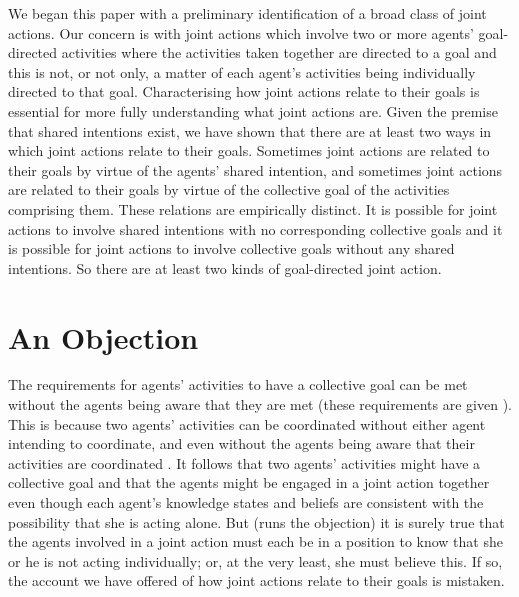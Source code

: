 \documentclass[12pt,a4paper]{extarticle}
\begin{document}
We began this paper with a preliminary identification of a broad class of joint actions.  
Our concern is with joint actions 
	which involve two or more agents' goal-directed activities 
		where the activities taken together are directed to a goal and this is not, or not only, a matter of each agent's activities being individually directed to that goal.
Characterising how joint actions relate to their goals is essential for more fully understanding what joint actions are.
Given the premise that shared intentions exist, we have shown that there are at least two ways in which joint actions relate to their goals.
Sometimes joint actions are related to their goals by virtue of the agents' shared intention, and sometimes joint actions are related to their goals by virtue of the collective goal of the activities comprising them.  
These relations are empirically distinct.  
It is possible for joint actions to involve shared intentions with no corresponding collective goals and it is possible for joint actions to involve collective goals without any shared intentions.
So there are at least two kinds of goal-directed joint action.


\section{An Objection
	\label{section_objection}
}
The requirements for agents' activities to have a collective goal can be met without the agents being aware that they are met 
(these requirements are given ).  
This is because two agents' activities can be coordinated without either agent intending to coordinate, and even without the agents being aware that their activities are coordinated \citep{Sebanz:2003kf, schmidt_understanding_2010}.
It follows that two agents' activities might have a collective goal 
and that the agents might be engaged in a joint action together
even though each agent's knowledge states and beliefs are consistent with the possibility that she is acting alone.  
But (runs the objection) it is surely true that the agents involved in a joint action must each be in a position to know that she or he is not acting individually; or, at the very least, she must believe this.
If so, the account we have offered of how joint actions relate to their goals is mistaken.
\end{document}
